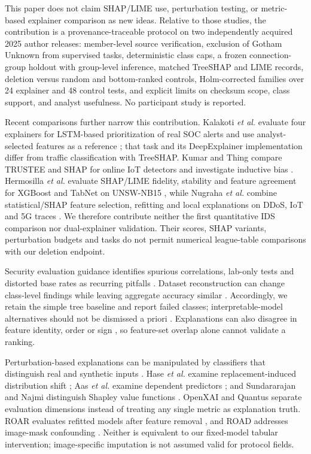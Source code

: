 \documentclass[conference,letterpaper]{IEEEtran}
\begin{document}
This paper does not claim SHAP/LIME use, perturbation testing, or metric-based explainer comparison as new ideas. Relative to those studies, the contribution is a provenance-traceable protocol on two independently acquired 2025 author releases: member-level source verification, exclusion of Gotham Unknown from supervised tasks, deterministic class caps, a frozen connection-group holdout with group-level inference, matched TreeSHAP and LIME records, deletion versus random and bottom-ranked controls, Holm-corrected families over 24 explainer and 48 control tests, and explicit limits on checksum scope, class support, and analyst usefulness. No participant study is reported.

Recent comparisons further narrow this contribution. Kalakoti \emph{et al.} evaluate four explainers for LSTM-based prioritization of real SOC alerts and use analyst-selected features as a reference \cite{ref17}; that task and its DeepExplainer implementation differ from traffic classification with TreeSHAP. Kumar and Thing compare TRUSTEE and SHAP for online IoT detectors and investigate inductive bias \cite{ref18}. Hermosilla \emph{et al.} evaluate SHAP/LIME fidelity, stability and feature agreement for XGBoost and TabNet on UNSW-NB15 \cite{ref19}, while Nugraha \emph{et al.} combine statistical/SHAP feature selection, refitting and local explanations on DDoS, IoT and 5G traces \cite{ref20}. We therefore contribute neither the first quantitative IDS comparison nor dual-explainer validation. Their scores, SHAP variants, perturbation budgets and tasks do not permit numerical league-table comparisons with our deletion endpoint.

Security evaluation guidance identifies spurious correlations, lab-only tests and distorted base rates as recurring pitfalls \cite{ref21}. Dataset reconstruction can change class-level findings while leaving aggregate accuracy similar \cite{ref22}. Accordingly, we retain the simple tree baseline and report failed classes; interpretable-model alternatives should not be dismissed a priori \cite{ref23}. Explanations can also disagree in feature identity, order or sign \cite{ref24}, so feature-set overlap alone cannot validate a ranking.

Perturbation-based explanations can be manipulated by classifiers that distinguish real and synthetic inputs \cite{ref25}. Hase \emph{et al.} examine replacement-induced distribution shift \cite{ref26}; Aas \emph{et al.} examine dependent predictors \cite{ref27}; and Sundararajan and Najmi distinguish Shapley value functions \cite{ref28}. OpenXAI \cite{ref29} and Quantus \cite{ref30} separate evaluation dimensions instead of treating any single metric as explanation truth. ROAR evaluates refitted models after feature removal \cite{ref31}, and ROAD addresses image-mask confounding \cite{ref32}. Neither is equivalent to our fixed-model tabular intervention; image-specific imputation is not assumed valid for protocol fields.
\end{document}
